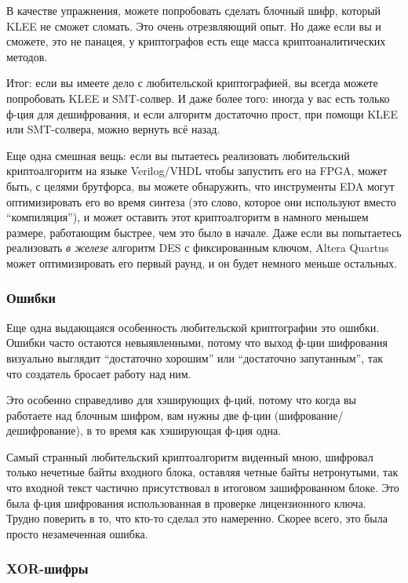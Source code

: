 

В качестве упражнения, можете попробовать сделать блочный шифр, который KLEE не сможет сломать.
Это очень отрезвляющий опыт.
Но даже если вы и сможете, это не панацея, у криптографов есть еще масса криптоаналитических методов.

Итог: если вы имеете дело с любительской криптографией, вы всегда можете попробовать KLEE и SMT-солвер.
И даже более того: иногда у вас есть только ф-ция для дешифрования, и если алгоритм достаточно прост,
при помощи KLEE или SMT-солвера, можно вернуть всё назад.

Еще одна смешная вещь: если вы пытаетесь реализовать любительский криптоалгоритм на языке Verilog/VHDL чтобы запустить
его на \ac{FPGA}, может быть, с целями брутфорса, вы можете обнаружить, что инструменты \ac{EDA} могут оптимизировать
его во время синтеза (это слово, которое они используют вместо ``компиляция''), и может оставить этот криптоалгоритм
в намного меньшем размере, работающим быстрее, чем это было в начале.
Даже если вы попытаетесь реализовать \textit{в железе} алгоритм DES с фиксированным ключом,
Altera Quartus может оптимизировать его первый раунд, и он будет немного меньше остальных.

\subsubsection{Ошибки}

Еще одна выдающаяся особенность любительской криптографии это ошибки.
Ошибки часто остаются невыявленными, потому что выход ф-ции шифрования визуально выглядит ``достаточно хорошим''
или ``достаточно запутанным'', так что создатель бросает работу над ним.

Это особенно справедливо для хэширующих ф-ций, потому что когда вы работаете над блочным шифром, вам нужны
две ф-ции (шифрование/дешифрование), в то время как хэширующая ф-ция одна.

Самый странный любительский криптоалгоритм виденный мною, шифровал только нечетные байты входного блока,
оставляя четные байты нетронутыми, так что входной текст частично присутствовал в итоговом зашифрованном блоке.
Это была ф-ция шифрования использованная в проверке лицензионного ключа.
Трудно поверить в то, что кто-то сделал это намеренно.
Скорее всего, это была просто незамеченная ошибка.

\subsubsection{XOR-шифры}

